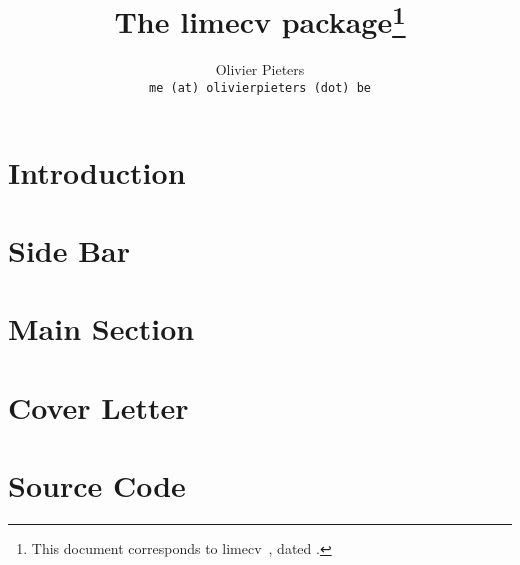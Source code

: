 \documentclass{article}
\title{The \textsf{limecv} package\thanks{This document corresponds to \textsf{limecv}~\fileversion, dated \filedate.}}
\author{Olivier Pieters \\ \texttt{me (at) olivierpieters (dot) be}}
\begin{document}
\maketitle

\section{Introduction}



\section{Side Bar}

\section{Main Section}

\section{Cover Letter}

\section{Source Code}


\end{document}
